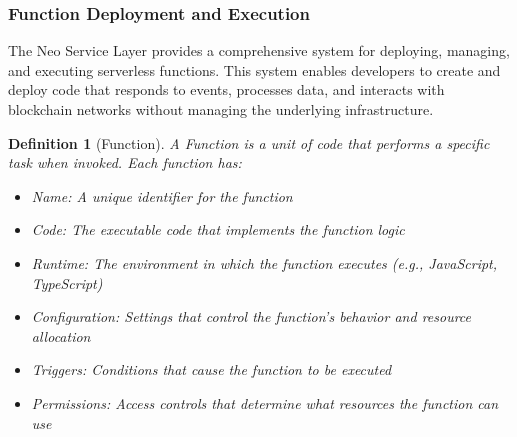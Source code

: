 \documentclass[12pt,a4paper]{article}
\newtheorem{definition}{Definition}
\begin{document}
\subsubsection{Function Deployment and Execution}
\label{subsubsec:function-deployment}

The Neo Service Layer provides a comprehensive system for deploying, managing, and executing serverless functions. This system enables developers to create and deploy code that responds to events, processes data, and interacts with blockchain networks without managing the underlying infrastructure.



\begin{definition}[Function]
A Function is a unit of code that performs a specific task when invoked. Each function has:
\begin{itemize}
    \item Name: A unique identifier for the function
    \item Code: The executable code that implements the function logic
    \item Runtime: The environment in which the function executes (e.g., JavaScript, TypeScript)
    \item Configuration: Settings that control the function's behavior and resource allocation
    \item Triggers: Conditions that cause the function to be executed
    \item Permissions: Access controls that determine what resources the function can use
\end{itemize}
\end{definition}
\end{document}
